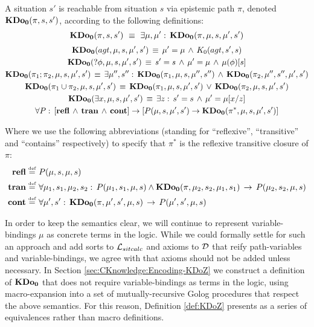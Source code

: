\begin{defnL}
 A situation $s'$ is reachable
from situation $s$ via epistemic path $\pi$, denoted $\mathbf{KDo_{0}}(\pi,s,s')$,
according to the following definitions:\label{def:KDoZ}\[
\mathbf{KDo_{0}}(\pi,s,s')\,\,\equiv\,\,\exists\mu,\mu':\,\mathbf{KDo_{0}}(\pi,\mu,s,\mu',s')\]
 \begin{gather*}
\mathbf{KDo_{0}}(agt,\mu,s,\mu',s')\,\equiv\,\mu'=\mu\,\wedge\, K_{0}(agt,s',s)\\
\mathbf{KDo_{0}}(?\phi,\mu,s,\mu',s')\,\equiv\, s'=s\,\wedge\,\mu'=\mu\,\wedge\,\mu(\phi)[s]\\
\mathbf{KDo_{0}}(\pi_{1};\pi_{2},\mu,s,\mu',s')\,\equiv\,\exists\mu'',s'':\,\mathbf{KDo_{0}}(\pi_{1},\mu,s,\mu'',s'')\,\wedge\,\mathbf{KDo_{0}}(\pi_{2},\mu'',s'',\mu',s')\\
\mathbf{KDo_{0}}(\pi_{1}\cup\pi_{2},\mu,s,\mu',s')\,\equiv\,\mathbf{KDo_{0}}(\pi_{1},\mu,s,\mu',s')\,\vee\,\mathbf{KDo_{0}}(\pi_{2},\mu,s,\mu',s')\\
\mathbf{KDo_{0}}(\exists x,\mu,s,\mu',s')\,\equiv\,\exists z:\, s'=s\,\wedge\,\mu'=\mu[x/z]\\
\forall P:\,\left[\mathbf{refl}\,\wedge\,\mathbf{tran}\,\wedge\,\mathbf{cont}\right]\rightarrow\left[P(\mu,s,\mu',s')\rightarrow\mathbf{KDo_{0}}(\pi^{*},\mu,s,\mu',s')\right]\end{gather*}

\end{defnL}
Where we use the following abbreviations (standing for {}``reflexive'',
{}``transitive'' and {}``contains'' respectively) to specify that
$\pi^{*}$ is the reflexive transitive closure of $\pi$:\begin{align*}
\mathbf{refl}\stackrel{\mbox{\tiny def}}{=} & \,\, P(\mu,s,\mu,s)\\
\mathbf{tran\stackrel{\mbox{\tiny def}}{=}} & \,\,\forall\mu_{1},s_{1},\mu_{2},s_{2}:\, P(\mu_{1},s_{1},\mu,s)\wedge\mathbf{KDo_{0}}(\pi,\mu_{2},s_{2},\mu_{1},s_{1})\,\rightarrow\, P(\mu_{2},s_{2},\mu,s)\\
\mathbf{cont}\stackrel{\mbox{\tiny def}}{=} & \,\,\forall\mu',s':\,\mathbf{KDo_{0}}(\pi,\mu',s',\mu,s)\,\rightarrow\, P(\mu',s',\mu,s)\end{align*}


In order to keep the semantics clear, we will continue to represent
variable-bindings $\mu$ as concrete terms in the logic. While we
could formally settle for such an approach and add sorts to $\mathcal{L}_{sitcalc}$
and axioms to $\mathcal{D}$ that reify path-variables and variable-bindings,
we agree with \citet{levesque97golog} that axioms should not be added
unless necessary. In Section \ref{sec:CKnowledge:Encoding-KDoZ} we
construct a definition of $\mathbf{KDo_{0}}$ that does not require variable-bindings
as terms in the logic, using macro-expansion into a set of mutually-recursive
Golog procedures that respect the above semantics. For this reason,
Definition \ref{def:KDoZ} presents as a series of equivalences rather
than macro definitions.

